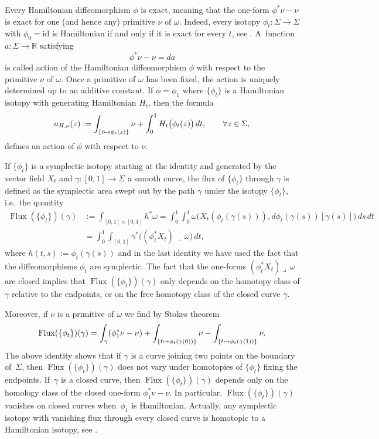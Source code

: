 \documentclass[10pt,a4paper]{amsart}
\providecommand{\ie}{i.e.\ }
\let\mathds\mathbb
\newcommand\mto{\mathchoice{\longmapsto}{\mapsto}{\mapsto}{\mapsto}}
\theoremstyle{definition}
\DeclareMathOperator{\Flux}{\mathrm{Flux}}
\newcommand{\R}{\mathds{R}}
\providecommand{\ie}{i.e. }
\begin{document}
Every Hamiltonian diffeomorphism $\phi$ is exact, meaning that the one-form $\phi^* \nu - \nu$ is exact for one (and hence any) primitive $\nu$ of $\omega$. Indeed, every isotopy $\phi_t: \Sigma \to \Sigma$ with $\phi_0=\mathrm{id}$ is Hamiltonian if and only if it is exact for every $t$, see \cite[Prop.\,9.3.1]{McDuff:1998uu}. A~function $a: \Sigma \to \R$ satisfying
\[
\phi^* \nu - \nu = da
\]
is called action of the Hamiltonian diffeomorphism $\phi$ with respect to the primitive $\nu$ of $\omega$. Once a primitive of $\omega$ has been fixed, the action is uniquely determined up to an additive constant. If $\phi=\phi_1$ where $\{\phi_t\}$ is a Hamiltonian isotopy with generating Hamiltonian $H_t$, then the formula
\begin{equation}
\label{canaction}
a_{H,\nu}(z) := \int_{\{t\mto \phi_t(z)\}} \nu + \int_0^1 H_t \bigl(\phi_t(z)\bigr)\, dt, \qquad \forall z\in \Sigma,
\end{equation}
defines an action of $\phi$ with respect to $\nu$.

If $\{\phi_t\}$ is a symplectic isotopy starting at the identity and generated by the vector field $X_t$ and $\gamma: [0,1] \to \Sigma$ a smooth curve, the flux of $\{\phi_t\}$ through $\gamma$ is defined as the symplectic area swept out by the path $\gamma$ under the isotopy $\{\phi_t\}$, \ie the quantity
\[
\begin{split}
\Flux(\{\phi_t\})(\gamma) &:= \int_{[0,1]\times [0,1]} h^* \omega = \int_0^1 \int_0^1 \omega\bigl(X_t(\phi_t(\gamma(s))),d\phi_t(\gamma(s)) [ \dot{\gamma}(s) ] \bigr)\, ds \, dt \\ &= \int_0^1 \int_{[0,1]} \gamma^* \bigl( (\phi_t^* X_t) \,\lrcorner\, \omega \bigr)\, dt,
\end{split}
\]
where $h(t,s) := \phi_t(\gamma(s))$ and in the last identity we have used the fact that the diffeomorphisms $\phi_t$ are symplectic. The fact that the one-forms $(\phi_t^*X_t)\lrcorner\,\omega$ are closed implies that $\Flux(\{\phi_t\})(\gamma)$ only depends on the homotopy class of $\gamma$ relative to the endpoints, or on the free homotopy class of the closed curve $\gamma$.

Moreover, if $\nu$ is a primitive of $\omega$ we find by Stokes theorem
\[
\Flux(\{\phi_t\})(\gamma) = \int_{\gamma} (\phi_1^* \nu-\nu) + \int_{\{t \mto \phi_t(\gamma(0))\}} \nu - \int_{\{t \mto \phi_t(\gamma(1))\}} \nu.
\]
The above identity shows that if $\gamma$ is a curve joining two points on the boundary of~$\Sigma$, then $\Flux(\{\phi_t\})(\gamma)$ does not vary under homotopies of $\{\phi_t\}$ fixing the endpoints. If~$\gamma$ is a closed curve, then $\Flux(\{\phi_t\})(\gamma)$ depends only on the homology class of the closed one-form $\phi_1^* \nu - \nu$. In particular, $\Flux(\{\phi_t\})(\gamma)$ vanishes on closed curves when~$\phi_1$ is Hamiltonian. Actually, any symplectic isotopy with vanishing flux through every closed curve is homotopic to a Hamiltonian isotopy, see \cite[Th.\,10.2.5]{McDuff:1998uu}.
\end{document}
